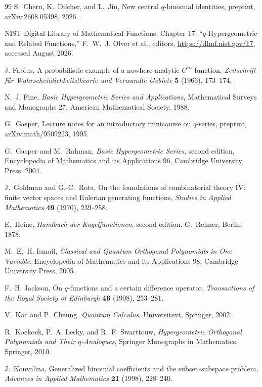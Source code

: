 \documentclass[11pt,oneside,openany]{book}
\theoremstyle{definition}
\theoremstyle{remark}
\begin{document}
\begin{thebibliography}{99}
S.~Chern, K.~Dilcher, and L.~Jiu,
New central $q$-binomial identities,
preprint, arXiv:2608.05498, 2026.

NIST Digital Library of Mathematical Functions,
Chapter 17, ``$q$-Hypergeometric and Related Functions,''
F.~W.~J. Olver et al., editors, \url{https://dlmf.nist.gov/17}, accessed August 2026.

J. Fabius,
A probabilistic example of a nowhere analytic $C^\infty$-function,
\emph{Zeitschrift f\"ur Wahrscheinlichkeitstheorie und Verwandte Gebiete}
\textbf{5} (1966), 173--174.

N.~J. Fine,
\emph{Basic Hypergeometric Series and Applications},
Mathematical Surveys and Monographs 27, American Mathematical Society, 1988.

G.~Gasper,
Lecture notes for an introductory minicourse on $q$-series,
preprint, arXiv:math/9509223, 1995.

G.~Gasper and M.~Rahman,
\emph{Basic Hypergeometric Series}, second edition,
Encyclopedia of Mathematics and its Applications 96, Cambridge University Press, 2004.

J.~Goldman and G.-C.~Rota,
On the foundations of combinatorial theory IV: finite vector spaces and Eulerian generating functions,
\emph{Studies in Applied Mathematics} \textbf{49} (1970), 239--258.

E.~Heine,
\emph{Handbuch der Kugelfunctionen}, second edition,
G.~Reimer, Berlin, 1878.

M.~E.~H. Ismail,
\emph{Classical and Quantum Orthogonal Polynomials in One Variable},
Encyclopedia of Mathematics and its Applications 98, Cambridge University Press, 2005.

F.~H. Jackson,
On $q$-functions and a certain difference operator,
\emph{Transactions of the Royal Society of Edinburgh} \textbf{46} (1908), 253--281.

V.~Kac and P.~Cheung,
\emph{Quantum Calculus},
Universitext, Springer, 2002.

R.~Koekoek, P.~A. Lesky, and R.~F. Swarttouw,
\emph{Hypergeometric Orthogonal Polynomials and Their $q$-Analogues},
Springer Monographs in Mathematics, Springer, 2010.

J.~Konvalina,
Generalized binomial coefficients and the subset--subspace problem,
\emph{Advances in Applied Mathematics} \textbf{21} (1998), 228--240.


\end{thebibliography}
\end{document}
